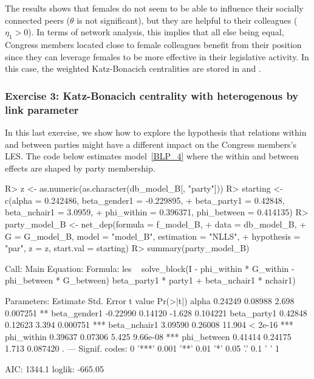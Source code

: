 \documentclass[nojss]{jss}
\begin{document}
The results shows that females do not seem to be able to influence their socially connected peers ($\theta$ is not significant), but they are helpful to their colleagues ($\eta_{1}>0$). In terms of network analysis, this implies that all else being equal, Congress members located close to female colleagues benefit from their position since they can leverage females to be more effective in their legislative activity. In this case, the weighted Katz-Bonacich centralities are stored in 
and .

\subsubsection{Exercise 3: Katz-Bonacich centrality with heterogenous by link parameter}

In this last exercise, we show how to explore the hypothesis that relations within and between parties might have a different impact on the Congress members's LES. The code below estimates model~\ref{BLP_4} where the within and between effects are shaped by party membership.

\begin{CodeChunk}
\begin{CodeInput}
R> z <- as.numeric(as.character(db_model_B[, "party"]))
R> starting <- c(alpha = 0.242486, beta_gender1 = -0.229895,
+    beta_party1 = 0.42848, beta_nchair1 = 3.0959,
+    phi_within = 0.396371, phi_between = 0.414135)
R> party_model_B <- net_dep(formula = f_model_B,
+    data = db_model_B,
+    G = G_model_B, model = "model_B", estimation = "NLLS",
+    hypothesis = "par", z = z, start.val = starting)
R> summary(party_model_B)
\end{CodeInput}
\begin{CodeOutput}
Call:
Main Equation:  
Formula: les ~ solve_block(I - phi_within * G_within - 
phi_between * G_between) %
beta_party1 * party1 + beta_nchair1 * nchair1)

Parameters:
	    Estimate Std. Error t value Pr(>|t|)    
alpha         0.24249    0.08988   2.698 0.007251 ** 
beta_gender1 -0.22990    0.14120  -1.628 0.104221    
beta_party1   0.42848    0.12623   3.394 0.000751 ***
beta_nchair1  3.09590    0.26008  11.904  < 2e-16 ***
phi_within    0.39637    0.07306   5.425 9.66e-08 ***
phi_between   0.41414    0.24175   1.713 0.087420 .  
---
Signif. codes:  0 '***' 0.001 '**' 0.01 '*' 0.05 '.' 0.1 ' ' 1

AIC: 1344.1  loglik: -665.05
\end{CodeOutput}
\end{CodeChunk}
\end{document}
